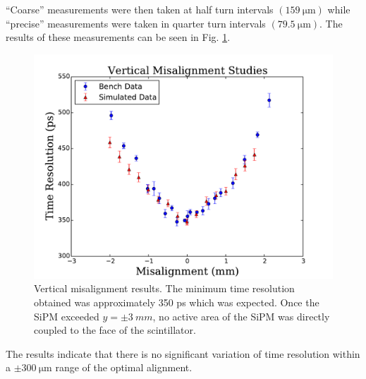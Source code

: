 ``Coarse'' measurements were then taken at half turn intervals $(159\ \mathrm{\mu m})$ while ``precise'' measurements were taken in quarter turn intervals $(79.5\ \mathrm{\mu m})$.  The results of these measurements can be seen in Fig. \ref{fig:sipm_va}.
	\begin{figure}[!htb]
	\centering
	\includegraphics[width=1.0\columnwidth]{misalignment/figs/vert_ma_v2}
	\caption{Vertical misalignment results.  The minimum time resolution obtained was approximately 350 ps which was expected.  Once the SiPM exceeded $y = \pm 3\ mm$, no active area of the SiPM was directly coupled to the face of the scintillator.}
	\label{fig:sipm_va}
\end{figure}
The results indicate that there is no significant variation of time resolution within a $\pm 300\ \mathrm{\mu m}$ range of the optimal alignment.  

